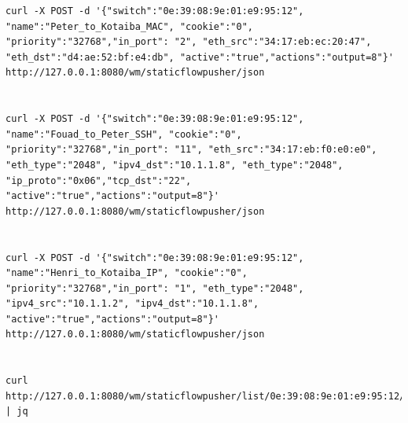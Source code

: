 \documentclass[a4paper]{article}
\begin{document}
\begin{verbatim}
curl -X POST -d '{"switch":"0e:39:08:9e:01:e9:95:12", "name":"Peter_to_Kotaiba_MAC", "cookie":"0", "priority":"32768","in_port": "2", "eth_src":"34:17:eb:ec:20:47", "eth_dst":"d4:ae:52:bf:e4:db", "active":"true","actions":"output=8"}' http://127.0.0.1:8080/wm/staticflowpusher/json


curl -X POST -d '{"switch":"0e:39:08:9e:01:e9:95:12", "name":"Fouad_to_Peter_SSH", "cookie":"0", "priority":"32768","in_port": "11", "eth_src":"34:17:eb:f0:e0:e0", "eth_type":"2048", "ipv4_dst":"10.1.1.8", "eth_type":"2048", "ip_proto":"0x06","tcp_dst":"22", "active":"true","actions":"output=8"}' http://127.0.0.1:8080/wm/staticflowpusher/json


curl -X POST -d '{"switch":"0e:39:08:9e:01:e9:95:12", "name":"Henri_to_Kotaiba_IP", "cookie":"0", "priority":"32768","in_port": "1", "eth_type":"2048", "ipv4_src":"10.1.1.2", "ipv4_dst":"10.1.1.8", "active":"true","actions":"output=8"}' http://127.0.0.1:8080/wm/staticflowpusher/json


curl http://127.0.0.1:8080/wm/staticflowpusher/list/0e:39:08:9e:01:e9:95:12/json | jq



\end{verbatim}
\end{document}
